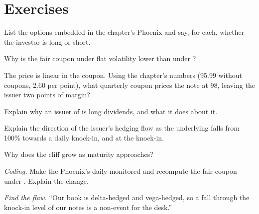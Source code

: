 \section{Exercises}

\begin{exercise}[$\star$]\label{exo:dv:autocallables:1}
List the options embedded in the chapter's Phoenix and say, for each, whether the investor is long or short.
\end{exercise}

\begin{exercise}[$\star$]\label{exo:dv:autocallables:2}
Why is the fair coupon under flat volatility lower than under ?
\end{exercise}

\begin{exercise}[$\star$]\label{exo:dv:autocallables:3}
The price is linear in the coupon. Using the chapter's numbers (95.99 without coupons, 2.60 per point), what quarterly coupon prices the
note at 98, leaving the issuer two points of margin?
\end{exercise}

\begin{exercise}[$\star\star$]\label{exo:dv:autocallables:4}
Explain why an issuer of  is long dividends, and what it does about it.
\end{exercise}

\begin{exercise}[$\star\star$]\label{exo:dv:autocallables:5}
Explain the direction of the issuer's hedging flow as the underlying falls from 100\% towards a daily knock-in, and at the knock-in.
\end{exercise}

\begin{exercise}[$\star\star$]\label{exo:dv:autocallables:6}
Why does the cliff grow as maturity approaches?
\end{exercise}

\begin{exercise}[$\star\star\star$]\label{exo:dv:autocallables:7}
\emph{Coding.} Make the Phoenix's  daily-monitored and recompute the fair coupon under . Explain the
change.
\end{exercise}

\begin{exercise}[$\star\star\star$]\label{exo:dv:autocallables:8}
\emph{Find the flaw.} ``Our  book is delta-hedged and vega-hedged, so a fall through the knock-in level of our notes is a
non-event for the desk.''
\end{exercise}

